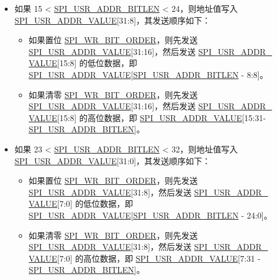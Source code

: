 \documentclass[main\_\_CN.tex]{subfiles}
\begin{document}
\begin{itemize}
\item  如果 15 < \hyperref[fielddesc:SPIUSRADDRBITLEN]{SPI\_USR\_ADDR\_BITLEN} < 24，则地址值写入 \hyperref[fielddesc:SPIUSRADDRVALUE]{SPI\_USR\_ADDR\_VALUE}[31:8]，其发送顺序如下：
\begin{itemize}
    \item 如果置位 \hyperref[fielddesc:SPIWRBITORDER]{SPI\_WR\_BIT\_ORDER}，则先发送 \hyperref[fielddesc:SPIUSRADDRVALUE]{SPI\_USR\_ADDR\_VALUE}[31:16]，然后发送 \hyperref[fielddesc:SPIUSRADDRVALUE]{SPI\_USR\_ADDR\_\\VALUE}[15:8] 的低位数据，即 \hyperref[fielddesc:SPIUSRADDRVALUE]{SPI\_USR\_ADDR\_VALUE}[\hyperref[fielddesc:SPIUSRADDRBITLEN]{SPI\_USR\_ADDR\_BITLEN} - 8:8]。
    \item 如果清零 \hyperref[fielddesc:SPIWRBITORDER]{SPI\_WR\_BIT\_ORDER}，则先发送 \hyperref[fielddesc:SPIUSRADDRVALUE]{SPI\_USR\_ADDR\_VALUE}[31:16]，然后发送 \hyperref[fielddesc:SPIUSRADDRVALUE]{SPI\_USR\_ADDR\_\\VALUE}[15:8] 的高位数据，即 \hyperref[fielddesc:SPIUSRADDRVALUE]{SPI\_USR\_ADDR\_VALUE}[15:31- \hyperref[fielddesc:SPIUSRADDRBITLEN]{SPI\_USR\_ADDR\_BITLEN}]。
\end{itemize}

\item  如果 23 < \hyperref[fielddesc:SPIUSRADDRBITLEN]{SPI\_USR\_ADDR\_BITLEN} < 32，则地址值写入 \hyperref[fielddesc:SPIUSRADDRVALUE]{SPI\_USR\_ADDR\_VALUE}[31:0]，其发送顺序如下：
\begin{itemize}
    \item 如果置位 \hyperref[fielddesc:SPIWRBITORDER]{SPI\_WR\_BIT\_ORDER}，则先发送 \hyperref[fielddesc:SPIUSRADDRVALUE]{SPI\_USR\_ADDR\_VALUE}[31:8]，然后发送 \hyperref[fielddesc:SPIUSRADDRVALUE]{SPI\_USR\_ADDR\_\\VALUE}[7:0] 的低位数据，即 \hyperref[fielddesc:SPIUSRADDRVALUE]{SPI\_USR\_ADDR\_VALUE}[\hyperref[fielddesc:SPIUSRADDRBITLEN]{SPI\_USR\_ADDR\_BITLEN} - 24:0]。
    \item 如果清零 \hyperref[fielddesc:SPIWRBITORDER]{SPI\_WR\_BIT\_ORDER}，则先发送 \hyperref[fielddesc:SPIUSRADDRVALUE]{SPI\_USR\_ADDR\_VALUE}[31:8]，然后发送 \hyperref[fielddesc:SPIUSRADDRVALUE]{SPI\_USR\_ADDR\_\\VALUE}[7:0] 的高位数据，即 \hyperref[fielddesc:SPIUSRADDRVALUE]{SPI\_USR\_ADDR\_VALUE}[7:31 - \hyperref[fielddesc:SPIUSRADDRBITLEN]{SPI\_USR\_ADDR\_BITLEN}]。
\end{itemize}
\end{itemize}
\end{document}
